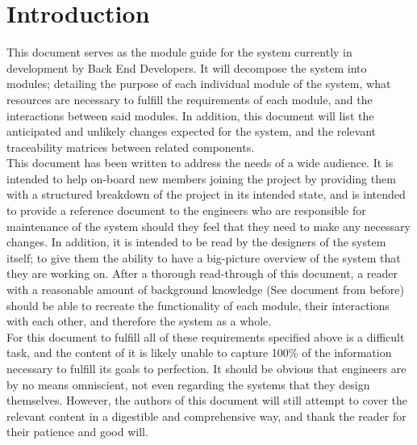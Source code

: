 \documentclass[12pt, titlepage]{article}
\begin{document}
\newpage

\tableofcontents

\listoftables

\listoffigures

\newpage


\section{Introduction}

This document serves as the module guide for the system currently in development by Back End Developers. It will decompose the system into modules; detailing the purpose of each individual module of the system, what resources are necessary to fulfill the requirements of each module, and the interactions between said modules. In addition, this document will list the anticipated and unlikely changes expected for the system, and the relevant traceability matrices between related components. \\

This document has been written to address the needs of a wide audience. It is intended to help on-board new members joining the project by providing them with a structured breakdown of the project in its intended state, and is intended to provide a reference document to the engineers who are responsible for maintenance of the system should they feel that they need to make any necessary changes. In addition, it is intended to be read by the designers of the system itself; to give them the ability to have a big-picture overview of the system that they are working on. After a thorough read-through of this document, a reader with a reasonable amount of background knowledge (See document from before) should be able to recreate the functionality of each module, their interactions with each other, and therefore the system as a whole.\\

For this document to fulfill all of these requirements specified above is a difficult task, and the content of it is likely unable to capture 100\% of the information necessary to fulfill its goals to perfection. It should be obvious that engineers are by no means omniscient, not even regarding the systems that they design themselves. However, the authors of this document will still attempt to cover the relevant content in a digestible and comprehensive way, and thank the reader for their patience and good will.\\
\end{document}
